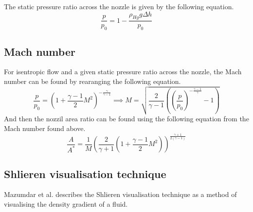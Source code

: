 \documentclass{article}
\begin{document}
The static pressure ratio across the nozzle is given by the following equation.
\begin{equation}
    \frac{p}{p_0} = 1 - \frac{\rho_{Hg} g \Delta h}{p_0}
\end{equation}

\subsection{Mach number}
For isentropic flow and a given static pressure ratio across the nozzle, the Mach number can be found by rearanging the following equation.
\begin{equation}
    \frac{p}{p_0} = \left( 1 + \frac{\gamma - 1}{2}M^2\right) ^ {-\frac{\gamma}{\gamma-1}} \implies M = \sqrt{\frac{2}{\gamma-1} \left( \left( \frac{p}{p_0}\right) ^ {-\frac{\gamma-1}{\gamma}} - 1\right)}
\end{equation}
And then the nozzil area ratio can be found using the following equation from the Mach number found above.
\begin{equation}
    \frac{A}{A^*} = \frac{1}{M} \left( \frac{2}{\gamma+1} \left( 1 + \frac{\gamma-1}{2}M^2\right) \right) ^ {\frac{\gamma+1}{2(\gamma-1)}}
\end{equation}

\subsection{Shlieren visualisation technique}

Mazumdar et al. \cite{Mazumdar_Amrita:2013} describes the Shlieren visualisation technique as a method of visualising the density gradient of a fluid.
\end{document}
